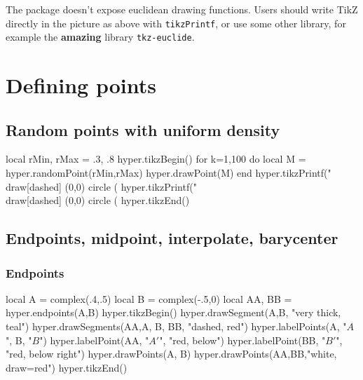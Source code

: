 \documentclass{article}
\begin{document}
The package doesn't expose euclidean drawing functions.
Users should write TikZ directly in the picture as above with \texttt{tikzPrintf}, or use some other library, for example the \textbf{amazing} library \texttt{tkz-euclide}. 

 

\section{Defining points}

\subsection{Random points with uniform density}

\begin{codeandresult}
\begin{luacode*}
local rMin, rMax = .3, .8
hyper.tikzBegin()
for k=1,100 do
	local M = hyper.randomPoint(rMin,rMax)
	hyper.drawPoint(M)
end
hyper.tikzPrintf("\\draw[dashed] (0,0) circle (%
hyper.tikzPrintf("\\draw[dashed] (0,0) circle (%
hyper.tikzEnd()
\end{luacode*}
\end{codeandresult}

\subsection{Endpoints, midpoint, interpolate, barycenter}



\subsubsection{Endpoints}
\begin{codeandresult}
\begin{luacode*}
local A = complex(.4,.5)
local B = complex(-.5,0)
local AA, BB = hyper.endpoints(A,B)
hyper.tikzBegin()
hyper.drawSegment(A,B, "very thick, teal")
hyper.drawSegments(AA,A, B, BB, "dashed, red")
hyper.labelPoints(A, "$A$", B, "$B$")
hyper.labelPoint(AA, "$A'$", "red, below")
hyper.labelPoint(BB, "$B'$", "red, below right")
hyper.drawPoints(A, B)
hyper.drawPoints(AA,BB,"white, draw=red")
hyper.tikzEnd()
\end{luacode*}
\end{codeandresult}
\end{document}
